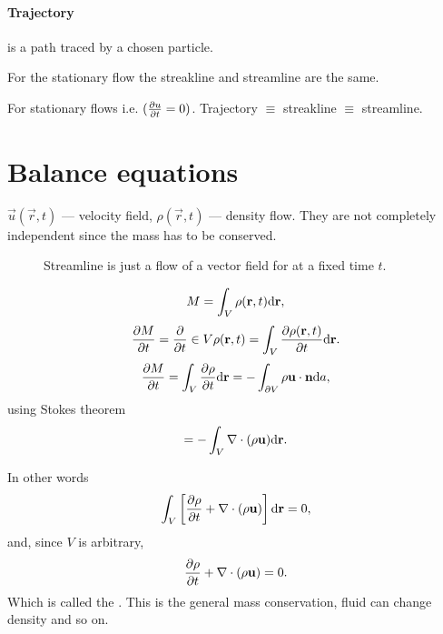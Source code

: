   \paragraph{Trajectory}
   is a path traced by a chosen particle.

  For the stationary flow the streakline and streamline are the same.
  
  For stationary flows i.e. $(\frac{\partial u}{\partial t} = 0)$.
  Trajectory $\equiv$ streakline $\equiv$ streamline.

  \section{Balance equations}
  $\vec u(\vec r, t)$ --- velocity field, $\rho(\vec r, t)$ --- density flow.
  They are not completely independent since the mass has to be conserved.

  \begin{figure}
    \centering
    \caption{Streamline is just a flow of a vector field for at a fixed time $t$.}
    \label{fig:1.12}
  \end{figure}
  
  \begin{displaymath}
    M = \int_V \rho(\mathbf{r}, t) \mathrm{d} \mathbf{r},
  \end{displaymath}
  \begin{displaymath}
    \frac{\partial M}{\partial t} = \frac{\partial }{\partial t} \in V \rho(\mathbf{r}, t) = \int_V \frac{\partial \rho(\mathbf{r}, t)}{\partial t} \mathrm{d} \mathbf{r}.
  \end{displaymath}
  \begin{displaymath}
    \frac{\partial M}{\partial t} = \int_V \frac{\partial \rho}{\partial t} \mathrm{d} \mathbf{r}
    = -\int_{\partial V} \rho \mathbf{u} \cdot \mathbf{n} \mathrm{d} a,
  \end{displaymath}
  using Stokes theorem
  \begin{displaymath}
    = - \int_V \nabla \cdot (\rho \mathbf{u})  \mathrm{d} \mathbf{r}.
  \end{displaymath}

  In other words
  \begin{displaymath}
    \int_V \left[ \frac{\partial \rho}{\partial t} + \nabla \cdot (\rho \mathbf{u}) \right] \mathrm{d} \mathbf{r} = 0 ,
  \end{displaymath}
  and, since $V$ is arbitrary,
  \begin{displaymath}
    \frac{\partial \rho}{\partial t} + \nabla \cdot (\rho \mathbf{u}) = 0.
  \end{displaymath}
  Which is called the .
  This is the general mass conservation, fluid can change density and so on.
